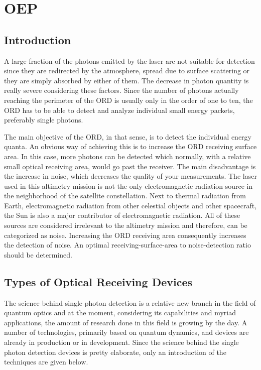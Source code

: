 \section{\acl{OEP}}
\label{designOptionsReceiver}
\subsection{Introduction}
A large fraction of the photons emitted by the \acs{laser} are not suitable for detection since they are redirected by the atmosphere, spread due to surface scattering or they are simply absorbed by either of them. The decrease in photon quantity is really severe considering these factors. Since the number of photons actually reaching the perimeter of the \ac{ORD} is usually only in the order of one to ten, the \acs{ORD} has to be able to detect and analyze individual small energy packets, preferably single photons. 

The main objective of the \acs{ORD}, in that sense, is to detect the individual energy quanta. An obvious way of achieving this is to increase the \acs{ORD} receiving surface area. In this case, more photons can be detected which normally, with a relative small optical receiving area, would go past the receiver. The main disadvantage is the increase in noise, which decreases the quality of your measurements. The \acs{laser} used in this altimetry mission is not the only electromagnetic radiation source in the neighborhood of the satellite constellation. Next to thermal radiation from Earth, electromagnetic radiation from other celestial objects and other spacecraft, the Sun is also a major contributor of electromagnetic radiation. All of these sources are considered irrelevant to the altimetry mission and therefore, can be categorized as noise. Increasing the \acs{ORD} receiving area consequently increases the detection of noise. An optimal receiving-surface-area to noise-detection ratio should be determined.

\subsection{Types of Optical Receiving Devices}
	\label{blDOtypesORD}
The science behind single photon detection is a relative new branch in the field of quantum optics and at the moment, considering its capabilities and myriad applications, the amount of research done in this field is growing by the day. A number of technologies, primarily based on quantum dynamics, and devices are already in production or in development. Since the science behind the single photon detection devices is pretty elaborate, only an introduction of the techniques are given below.

